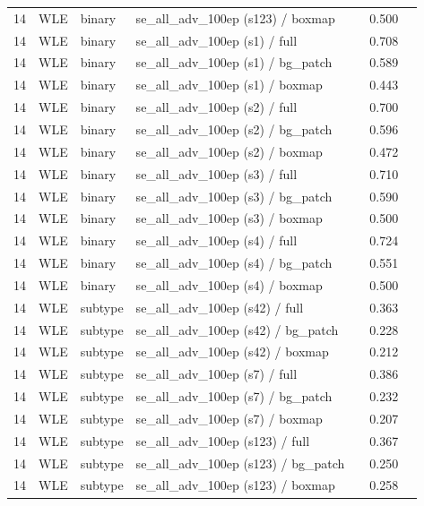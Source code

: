 \begin{longtable}{cL{1.1cm}L{1.5cm}L{5.6cm}ccc}
14 & WLE & binary & se\_all\_adv\_100ep (s123) / boxmap & \nl{} & 0.500 & \nl{} \\
14 & WLE & binary & se\_all\_adv\_100ep (s1) / full & \nl{} & 0.708 & \nl{} \\
14 & WLE & binary & se\_all\_adv\_100ep (s1) / bg\_patch & \nl{} & 0.589 & \nl{} \\
14 & WLE & binary & se\_all\_adv\_100ep (s1) / boxmap & \nl{} & 0.443 & \nl{} \\
14 & WLE & binary & se\_all\_adv\_100ep (s2) / full & \nl{} & 0.700 & \nl{} \\
14 & WLE & binary & se\_all\_adv\_100ep (s2) / bg\_patch & \nl{} & 0.596 & \nl{} \\
14 & WLE & binary & se\_all\_adv\_100ep (s2) / boxmap & \nl{} & 0.472 & \nl{} \\
14 & WLE & binary & se\_all\_adv\_100ep (s3) / full & \nl{} & 0.710 & \nl{} \\
14 & WLE & binary & se\_all\_adv\_100ep (s3) / bg\_patch & \nl{} & 0.590 & \nl{} \\
14 & WLE & binary & se\_all\_adv\_100ep (s3) / boxmap & \nl{} & 0.500 & \nl{} \\
14 & WLE & binary & se\_all\_adv\_100ep (s4) / full & \nl{} & 0.724 & \nl{} \\
14 & WLE & binary & se\_all\_adv\_100ep (s4) / bg\_patch & \nl{} & 0.551 & \nl{} \\
14 & WLE & binary & se\_all\_adv\_100ep (s4) / boxmap & \nl{} & 0.500 & \nl{} \\
14 & WLE & subtype & se\_all\_adv\_100ep (s42) / full & \nl{} & 0.363 & \nl{} \\
14 & WLE & subtype & se\_all\_adv\_100ep (s42) / bg\_patch & \nl{} & 0.228 & \nl{} \\
14 & WLE & subtype & se\_all\_adv\_100ep (s42) / boxmap & \nl{} & 0.212 & \nl{} \\
14 & WLE & subtype & se\_all\_adv\_100ep (s7) / full & \nl{} & 0.386 & \nl{} \\
14 & WLE & subtype & se\_all\_adv\_100ep (s7) / bg\_patch & \nl{} & 0.232 & \nl{} \\
14 & WLE & subtype & se\_all\_adv\_100ep (s7) / boxmap & \nl{} & 0.207 & \nl{} \\
14 & WLE & subtype & se\_all\_adv\_100ep (s123) / full & \nl{} & 0.367 & \nl{} \\
14 & WLE & subtype & se\_all\_adv\_100ep (s123) / bg\_patch & \nl{} & 0.250 & \nl{} \\
14 & WLE & subtype & se\_all\_adv\_100ep (s123) / boxmap & \nl{} & 0.258 & \nl{} \\

\end{longtable}
